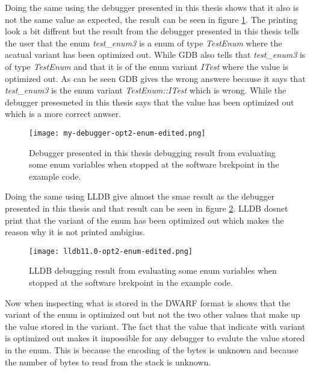 Doing the same using the debugger presented in this thesis shows that it also is not the same value as expected, the result can be seen in  figure \ref{fig:mydebuggerenum}.
The printing look a bit diffrent but the result from the debugger presented in this thesis tells the user that the enum \emph{test\_enum3} is a enum of type \emph{TestEnum} where the acatual variant has been optimized out.
While \gls{GDB} also tells that \emph{test\_enum3} is of type \emph{TestEnum} and that it is of the enum variant \emph{ITest} where the value is optimized out.
As can be seen \gls{GDB} gives the wrong answere because it says that \emph{test\_enum3} is the enum variant \emph{TestEnum::ITest} which is wrong.
While the debugger presesneted in this thesis says that the value has been optimized out which is a more correct anwser.


\begin{figure}[h]
	\centering
	\texttt{[image: my-debugger-opt2-enum-edited.png]}
	\caption{Debugger presented in this thesis debugging result from evaluating some enum variables when stopped at the software brekpoint in the example code.}
	\label{fig:mydebuggerenum}
\end{figure}


Doing the same using \gls{LLDB} give almost the smae result as the debugger presented in this thesis and that result can be seen in figure \ref{fig:lldbenum}.
\gls{LLDB} dosnet print that the variant of the enum has been optimized out which makes the reason why it is not printed ambigius.


\begin{figure}[h]
	\centering
	\texttt{[image: lldb11.0-opt2-enum-edited.png]}
	\caption{\gls{LLDB} debugging result from evaluating some enum variables when stopped at the software brekpoint in the example code.}
	\label{fig:lldbenum}
\end{figure}


Now when inspecting what is stored in the \gls{DWARF} format is shows that the variant of the enum is optimized out but not the two other values that make up the value stored in the variant.
The fact that the value that indicate with variant is optimized out makes it impossible for any debugger to evalute the value stored in the enum.
This is because the encoding of the bytes is unknown and because the number of bytes to read from the stack is unknown.


